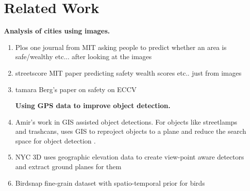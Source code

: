 \documentclass[10pt,twocolumn,letterpaper]{article}
\begin{document}
\section{Related Work}
\textbf{Analysis of cities using images.}
  \begin{enumerate}
     \item Plos one journal from MIT asking people to predict whether an area is safe/wealthy etc... after looking at the images
     \item streetscore MIT paper predicting safety wealth scores etc.. just from images~\cite{MIT_vision}
     \item tamara Berg's paper on safety on ECCV
     ~\cite{zhang2014part}
     ~\cite{caltech_birds}

\textbf{Using GPS data to improve object detection.}
     \item Amir's work in GIS assisted object detections. For objects like streetlamps and trashcans, uses GIS to reproject objects to a plane and reduce the search space for object detection .
     \item NYC 3D uses geographic elevation data to create view-point aware detectors and extract ground planes for  them
     \item Birdsnap fine-grain dataset with spatio-temporal prior for birds

  \end{enumerate}

\end{document}
